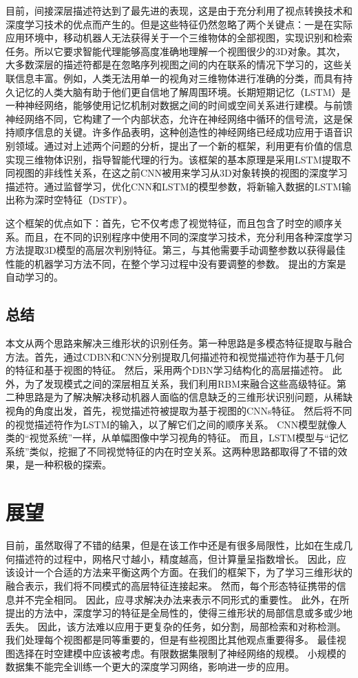 目前，间接深层描述符达到了最先进的表现，这是由于充分利用了视点转换技术和深度学习技术的优点而产生的。但是这些特征仍然忽略了两个关键点：一是在实际应用环境中，移动机器人无法获得关于一个三维物体的全部视图，实现识别和检索任务。所以它要求智能代理能够高度准确地理解一个视图很少的3D对象。其次，大多数深层的描述符都是在忽略序列视图之间的内在联系的情况下学习的，这些关联信息丰富。例如，人类无法用单一的视角对三维物体进行准确的分类，而具有持久记忆的人类大脑有助于他们更自信地了解周围环境。长期短期记忆（LSTM）是一种神经网络，能够使用记忆机制对数据之间的时间或空间关系进行建模。与前馈神经网络不同，它构建了一个内部状态，允许在神经网络中循环的信号流，这是保持顺序信息的关键。许多作品表明，这种创造性的神经网络已经成功应用于语音识别领域。通过对上述两个问题的分析，提出了一个新的框架，利用更有价值的信息实现三维物体识别，指导智能代理的行为。该框架的基本原理是采用LSTM提取不同视图的非线性关系，在这之前CNN被用来学习从3D对象转换的视图的深度学习描述符。通过监督学习，优化CNN和LSTM的模型参数，将新输入数据的LSTM输出称为深时空特征（DSTF）。


这个框架的优点如下：首先，它不仅考虑了视觉特征，而且包含了时空的顺序关系。而且，在不同的识别程序中使用不同的深度学习技术，充分利用各种深度学习方法提取3D模型的高层次判别特征。第三，与其他需要手动调整参数以获得最佳性能的机器学习方法不同，在整个学习过程中没有要调整的参数。 提出的方案是自动学习的。

\subsection{总结}

本文从两个思路来解决三维形状的识别任务。第一种思路是多模态特征提取与融合方法。首先，通过CDBN和CNN分别提取几何描述符和视觉描述符作为基于几何的特征和基于视图的特征。 然后，采用两个DBN学习结构化的高层描述符。 此外，为了发现模式之间的深层相互关系，我们利用RBM来融合这些高级特征。第二种思路是为了解决解决移动机器人面临的信息缺乏的三维形状识别问题，从稀缺视角的角度出发，首先，视觉描述符被提取为基于视图的CNNs特征。 然后将不同的视觉描述符作为LSTM的输入，以了解它们之间的顺序关系。 CNN模型就像人类的“视觉系统”一样，从单幅图像中学习视角的特征。 而且，LSTM模型与“记忆系统”类似，挖掘了不同视觉特征的内在时空关系。这两种思路都取得了不错的效果，是一种积极的探索。

\section{展望}
目前，虽然取得了不错的结果，但是在该工作中还是有很多局限性，比如在生成几何描述符的过程中，网格尺寸越小，精度越高，但计算量呈指数增长。 因此，应该设计一个合适的方法来平衡这两个方面。在我们的框架下，为了学习三维形状的融合表示，我们将不同模式的高层特征连接起来。 然而，每个形态特征携带的信息并不完全相同。 因此，应寻求解决办法来表示不同形式的重要性。 此外，在所提出的方法中，深度学习的特征是全局性的，使得三维形状的局部信息或多或少地丢失。 因此，该方法难以应用于更复杂的任务，如分割，局部检索和对称检测。我们处理每个视图都是同等重要的，但是有些视图比其他观点重要得多。 最佳视图选择在时空建模中应该被考虑。有限数据集限制了神经网络的规模。 小规模的数据集不能完全训练一个更大的深度学习网络，影响进一步的应用。

